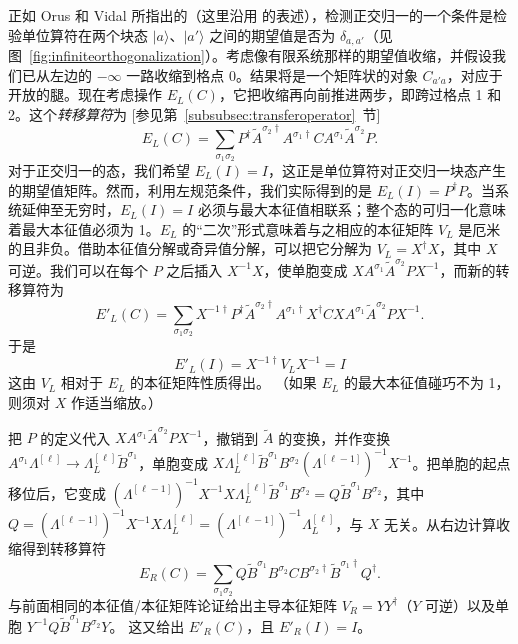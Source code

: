 \documentclass[a4paper,10pt,oneside,onecolumn,1p,times]{elsarticle}
\newcommand{\ket}[1]{\mbox{$| #1  \rangle$}}
\begin{document}
正如 Orus 和 Vidal\cite{Orus08} 所指出的（这里沿用 \cite{McCulloch08} 的表述），检测正交归一的一个条件是检验单位算符在两个块态 $\ket{a}$、$\ket{a'}$ 之间的期望值是否为 $\delta_{a,a'}$（见 图~\ref{fig:infiniteorthogonalization}）。考虑像有限系统那样的期望值收缩，并假设我们已从左边的 $-\infty$ 一路收缩到格点 $0$。结果将是一个矩阵状的对象 $C_{a'a}$，对应于开放的腿。现在考虑操作 $E_L(C)$，它把收缩再向前推进两步，即跨过格点 1 和 2。这个{\em 转移算符}为 [参见第~\ref{subsubsec:transferoperator}~节]
\begin{equation}
E_L(C) = \sum_{\sigma_1\sigma_2} P^\dagger \tilde{A}^{\sigma_2\dagger} A^{\sigma_1\dagger} C A^{\sigma_1} \tilde{A}^{\sigma_2} P.
\end{equation}
对于正交归一的态，我们希望 $E_L(I) = I$，这正是单位算符对正交归一块态产生的期望值矩阵。然而，利用左规范条件，我们实际得到的是 $E_L(I)=P^\dagger P$。当系统延伸至无穷时，$E_L(I) = I$ 必须与最大本征值相联系；整个态的可归一化意味着最大本征值必须为 1。$E_L$ 的“二次”形式意味着与之相应的本征矩阵 $V_L$ 是厄米的且非负。借助本征值分解或奇异值分解，可以把它分解为 $V_L = X^\dagger X$，其中 $X$ 可逆。我们可以在每个 $P$ 之后插入 $X^{-1}X$，使单胞变成 $X A^{\sigma_1} \tilde{A}^{\sigma_2} P X^{-1}$，而新的转移算符为
\begin{equation}
E'_L(C) = \sum_{\sigma_1\sigma_2} X^{-1\dagger}P^\dagger \tilde{A}^{\sigma_2\dagger} A^{\sigma_1\dagger} X^\dagger C X A^{\sigma_1} \tilde{A}^{\sigma_2} P X^{-1}.
\end{equation}
于是
\begin{equation}
E'_L(I) = X^{-1\dagger} V_L X^{-1} = I
\end{equation}
这由 $V_L$ 相对于 $E_L$ 的本征矩阵性质得出。
（如果 $E_L$ 的最大本征值碰巧不为 1，则须对 $X$ 作适当缩放。）

把 $P$ 的定义代入 $X A^{\sigma_1}\tilde{A}^{\sigma_2}P X^{-1}$，撤销到 $\tilde{A}$ 的变换，并作变换 $A^{\sigma_1} \Lambda^{[\ell]} \rightarrow \Lambda^{[\ell]}_L \tilde{B}^{\sigma_1}$，单胞变成 $X \Lambda^{[\ell]}_L \tilde{B}^{\sigma_1} B^{\sigma_2} (\Lambda^{[\ell-1]})^{-1} X^{-1}$。把单胞的起点移位后，它变成 $(\Lambda^{[\ell-1]})^{-1} X^{-1} X \Lambda^{[\ell]}_L \tilde{B}^{\sigma_1} B^{\sigma_2} = Q \tilde{B}^{\sigma_1} B^{\sigma_2}$，其中 $Q = (\Lambda^{[\ell-1]})^{-1} X^{-1} X \Lambda_L^{[\ell]} = (\Lambda^{[\ell-1]})^{-1} \Lambda_L^{[\ell]}$，与 $X$ 无关。从右边计算收缩得到转移算符
\begin{equation}
E_R(C) = \sum_{\sigma_1\sigma_2} Q \tilde{B}^{\sigma_1} B^{\sigma_2} C B^{\sigma_2\dagger} \tilde{B}^{\sigma_1\dagger} Q^\dagger .
\end{equation}
与前面相同的本征值/本征矩阵论证给出主导本征矩阵 $V_R = YY^\dagger$（$Y$ 可逆）以及单胞 $Y^{-1}Q \tilde{B}^{\sigma_1} B^{\sigma_2} Y$。
这又给出 $E'_R(C)$，且 $E'_R(I)=I$。
\end{document}
